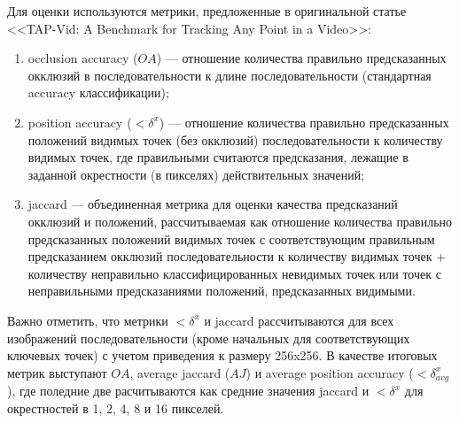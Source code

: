 \documentclass[a4paper, 14pt]{extarticle}
\theoremstyle{definition}
\theoremstyle{plain}
\theoremstyle{remark}
\begin{document}
Для оценки используются метрики, предложенные в оригинальной статье <<TAP-Vid: A Benchmark for Tracking Any Point in a Video>>: 
\begin{enumerate}
    \item occlusion accuracy ($OA$) --- отношение количества правильно предсказанных окклюзий в последовательности к длине последовательности (стандартная accuracy классификации);
    \item position accuracy ($<\delta^x$) --- отношение количества правильно предсказанных положений видимых точек (без окклюзий) последовательности к количеству видимых точек, где правильными считаются предсказания, лежащие в заданной окрестности (в пикселях) действительных значений;
    \item jaccard --- объединенная метрика для оценки качества предсказаний окклюзий и положений, рассчитываемая как отношение количества правильно предсказанных положений видимых точек с соответствующим правильным предсказанием окклюзий последовательности к количеству видимых точек + количеству неправильно классифицированных невидимых точек или точек с неправильными предсказаниями положений, предсказанных видимыми.
\end{enumerate}
Важно отметить, что метрики $<\delta^x$ и jaccard рассчитываются для всех изображений последовательности (кроме начальных для соответствующих ключевых точек) с учетом приведения к размеру 256x256.
В качестве итоговых метрик выступают $OA$, average jaccard ($AJ$) и average position accuracy ($<\delta^x_{avg}$), где поледние две расчитываются как средние значения jaccard и $<\delta^x$ для окрестностей в 1, 2, 4, 8 и 16 пикселей.
\end{document}
